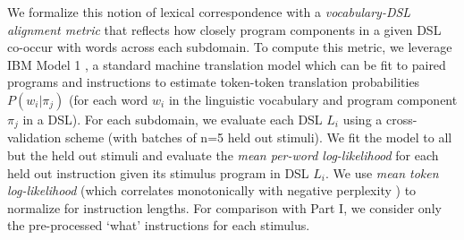 \documentclass[10pt,letterpaper]{article}
\begin{document}

We formalize this notion of lexical correspondence with a \textit{vocabulary-DSL alignment metric} that reflects how closely program components in a given DSL co-occur with words across each subdomain. To compute this metric, we leverage IBM Model 1 , a standard machine translation model which can be fit to paired programs and instructions to estimate token-token translation probabilities $P(w_i|\pi_j)$ (for each word $w_i$ in the linguistic vocabulary and program component $\pi_j$ in a DSL). For each subdomain, we evaluate each DSL $L_i$ using a cross-validation scheme (with batches of n=5 held out stimuli). We fit the model to all but the held out stimuli and evaluate the \textit{mean per-word log-likelihood} for each held out instruction given its stimulus program in DSL $L_i$. We use \textit{mean token log-likelihood} (which correlates monotonically with negative {perplexity} ) to normalize for instruction lengths. For comparison with Part I, we consider only the pre-processed `what' instructions for each stimulus.

\end{document}
